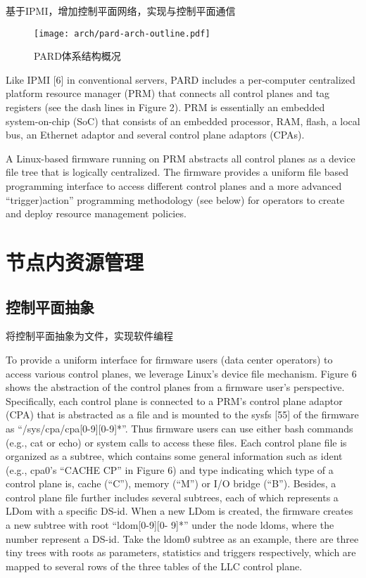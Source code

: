 基于IPMI，增加控制平面网络，实现与控制平面通信

\begin{figure}[tbh]
  \centering
  \texttt{[image: arch/pard-arch-outline.pdf]}
  \caption[PARD体系结构概况]{PARD体系结构概况}
  \label{fig:pard-arch-outline}
\end{figure}


Like IPMI [6] in conventional servers, PARD includes a
per-computer centralized platform resource manager (PRM) that
connects all control planes and tag registers (see the dash lines in
Figure 2). PRM is essentially an embedded system-on-chip (SoC)
that consists of an embedded processor, RAM, flash, a local bus, an
Ethernet adaptor and several control plane adaptors (CPAs).

A Linux-based firmware running on PRM abstracts all control
planes as a device file tree that is logically centralized. The
firmware provides a uniform file based programming interface to
access different control planes and a more advanced “trigger)action”
programming methodology (see below) for operators to create and
deploy resource management policies.


\section{节点内资源管理}

\subsection{控制平面抽象}

将控制平面抽象为文件，实现软件编程

To provide a uniform interface for firmware users (data center operators)
to access various control planes, we leverage Linux’s device
file mechanism. Figure 6 shows the abstraction of the control planes
from a firmware user’s perspective. Specifically, each control plane
is connected to a PRM’s control plane adaptor (CPA) that is abstracted
as a file and is mounted to the sysfs [55] of the firmware as
“/sys/cpa/cpa[0-9][0-9]*”. Thus firmware users can use either bash
commands (e.g., cat or echo) or system calls to access these files.
Each control plane file is organized as a subtree, which contains
some general information such as ident (e.g., cpa0’s “CACHE CP”
in Figure 6) and type indicating which type of a control plane
is, cache (“C”), memory (“M”) or I/O bridge (“B”). Besides, a
control plane file further includes several subtrees, each of which
represents a LDom with a specific DS-id. When a new LDom is
created, the firmware creates a new subtree with root “ldom[0-9][0-
9]*” under the node ldoms, where the number represent a DS-id.
Take the ldom0 subtree as an example, there are three tiny trees
with roots as parameters, statistics and triggers respectively, which
are mapped to several rows of the three tables of the LLC control
plane.

